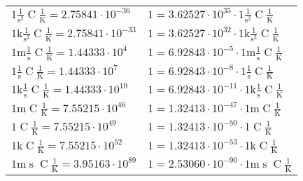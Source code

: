 \begin{center}
\begin{longtable}{l l}
{\color{black}$1 \bm{\mathrm{ }}{}\frac1{\operatorname{s}^2}{\operatorname{C}}\frac1{\operatorname{K}} = 2.75841\cdot10^{-36} $}   & {\color{black}$ 1 = 3.62527\cdot10^{35} \cdot 1 \bm{\mathrm{ }}{}\frac1{\operatorname{s}^2}{\operatorname{C}}\frac1{\operatorname{K}}$}  \\
{\color{gray}$1 \bm{\mathrm{ k}}{}\frac1{\operatorname{s}^2}{\operatorname{C}}\frac1{\operatorname{K}} = 2.75841\cdot10^{-33} $}   & {\color{gray}$ 1 = 3.62527\cdot10^{32} \cdot 1 \bm{\mathrm{ k}}{}\frac1{\operatorname{s}^2}{\operatorname{C}}\frac1{\operatorname{K}}$}  \\
{\color{gray}$1 \bm{\mathrm{ m}}{}\frac1{\operatorname{s}}{\operatorname{C}}\frac1{\operatorname{K}} = 1.44333\cdot10^{4} $}   & {\color{gray}$ 1 = 6.92843\cdot10^{-5} \cdot 1 \bm{\mathrm{ m}}{}\frac1{\operatorname{s}}{\operatorname{C}}\frac1{\operatorname{K}}$}  \\
{\color{black}$1 \bm{\mathrm{ }}{}\frac1{\operatorname{s}}{\operatorname{C}}\frac1{\operatorname{K}} = 1.44333\cdot10^{7} $}   & {\color{black}$ 1 = 6.92843\cdot10^{-8} \cdot 1 \bm{\mathrm{ }}{}\frac1{\operatorname{s}}{\operatorname{C}}\frac1{\operatorname{K}}$}  \\
{\color{gray}$1 \bm{\mathrm{ k}}{}\frac1{\operatorname{s}}{\operatorname{C}}\frac1{\operatorname{K}} = 1.44333\cdot10^{10} $}   & {\color{gray}$ 1 = 6.92843\cdot10^{-11} \cdot 1 \bm{\mathrm{ k}}{}\frac1{\operatorname{s}}{\operatorname{C}}\frac1{\operatorname{K}}$}  \\
{\color{gray}$1 \bm{\mathrm{ m}}{}{}{\operatorname{C}}\frac1{\operatorname{K}} = 7.55215\cdot10^{46} $}   & {\color{gray}$ 1 = 1.32413\cdot10^{-47} \cdot 1 \bm{\mathrm{ m}}{}{}{\operatorname{C}}\frac1{\operatorname{K}}$}  \\
{\color{black}$1 \bm{\mathrm{ }}{}{}{\operatorname{C}}\frac1{\operatorname{K}} = 7.55215\cdot10^{49} $}   & {\color{black}$ 1 = 1.32413\cdot10^{-50} \cdot 1 \bm{\mathrm{ }}{}{}{\operatorname{C}}\frac1{\operatorname{K}}$}  \\
{\color{gray}$1 \bm{\mathrm{ k}}{}{}{\operatorname{C}}\frac1{\operatorname{K}} = 7.55215\cdot10^{52} $}   & {\color{gray}$ 1 = 1.32413\cdot10^{-53} \cdot 1 \bm{\mathrm{ k}}{}{}{\operatorname{C}}\frac1{\operatorname{K}}$}  \\
{\color{gray}$1 \bm{\mathrm{ m}}{}{\operatorname{s}}{\operatorname{C}}\frac1{\operatorname{K}} = 3.95163\cdot10^{89} $}   & {\color{gray}$ 1 = 2.53060\cdot10^{-90} \cdot 1 \bm{\mathrm{ m}}{}{\operatorname{s}}{\operatorname{C}}\frac1{\operatorname{K}}$}  \\

\end{longtable}
\end{center}
